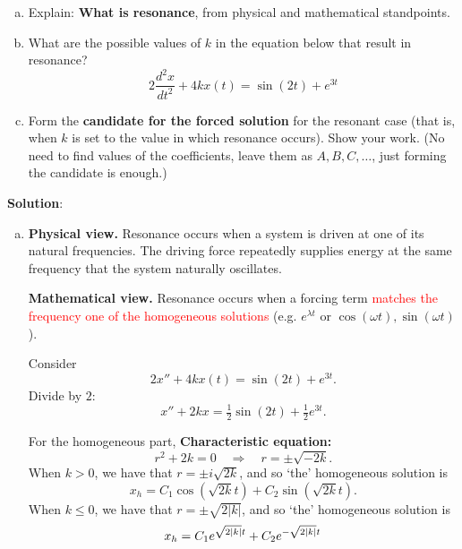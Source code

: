   \begin{example}
    \begin{enumerate}[(a)]
      \item Explain: \textbf{What is resonance}, from physical and mathematical standpoints.

      \vspace{2mm}

    \item What are the possible values of \(k\) in the equation below that result in resonance?
      \[
        2 \frac{d^{2}x}{dt^{2}} + 4 k x(t) = \sin(2t) + e^{3t}
      \]

    \item Form the \textbf{candidate for the forced solution} for the resonant case (that is, when \(k\) is set to the value in which resonance occurs).
      Show your work. (No need to find values of the coefficients, leave them as \(A,B,C,\dots\), just forming the candidate is enough.)
    \end{enumerate}
      \vspace{2mm}

    \textbf{Solution}:

    \vspace{2mm}
    \begin{enumerate}[(a)]
    \item
    \textbf{Physical view.} Resonance occurs when a system is driven at one of its natural frequencies. 
    The driving force repeatedly supplies energy at the same frequency that the system naturally oscillates.

    \textbf{Mathematical view.} Resonance occurs when a forcing term \textcolor{red}{matches the frequency one of the homogeneous solutions}
    (e.g. $e^{\lambda t}$ or $\cos(\omega t),\sin(\omega t)$).
    
    \vspace{3mm}

    \noindent Consider
    \[
    2x''+4k x(t)=\sin(2t)+e^{3t}.
    \]
    Divide by \(2\):
    \[
    x'' + 2k x = \tfrac{1}{2}\sin(2t) + \tfrac{1}{2}e^{3t}.
    \]

    For the homogeneous part, \textbf{Characteristic equation:}
    \[
    r^2 + 2k = 0 \quad\Longrightarrow\quad r = \pm \sqrt{-2k}.
    \]
    When \(k>0\), we have that \(r = \pm i\sqrt{2k}\), and so `the' homogeneous solution is
    \[
    x_h = C_1\cos(\sqrt{2k} t) + C_2\sin(\sqrt{2k} t).
    \]
    When \(k\leq 0\), we have that \(r = \pm \sqrt{2|k|}\), and so `the' homogeneous solution is
    \[
    x_h = C_1e^{\scriptsize{\sqrt{2|k|}t}} + C_2e^{\scriptsize{-\sqrt{2|k|}t}}
    \]


\end{enumerate}
\end{example}
